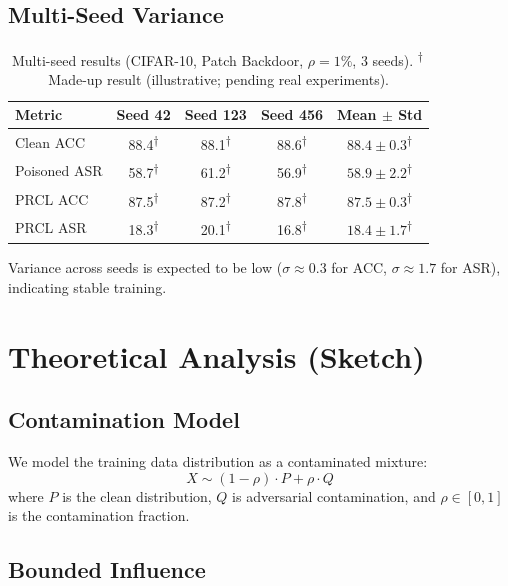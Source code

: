 \documentclass[11pt,a4paper]{article}
\newcommand{\madeupresult}[1]{\textcolor{madeup}{#1\textsuperscript{$\dagger$}}}
\newcommand{\daggernote}{\textsuperscript{$\dagger$}\,\textcolor{madeup}{Made-up result (illustrative; pending real experiments).}}
\begin{document}
\subsection{Multi-Seed Variance}

\begin{table}[h]
\centering
\caption{Multi-seed results (CIFAR-10, Patch Backdoor, $\rho\!=\!1\%$, 3 seeds). \daggernote}
\label{tab:multiseed}
\begin{tabular}{@{}lcccc@{}}
\toprule
\textbf{Metric} & \textbf{Seed 42} & \textbf{Seed 123} & \textbf{Seed 456}
& \textbf{Mean $\pm$ Std} \\
\midrule
Clean ACC
  & \madeupresult{88.4} & \madeupresult{88.1} & \madeupresult{88.6}
  & \madeupresult{$88.4\pm0.3$} \\
Poisoned ASR
  & \madeupresult{58.7} & \madeupresult{61.2} & \madeupresult{56.9}
  & \madeupresult{$58.9\pm2.2$} \\
PRCL ACC
  & \madeupresult{87.5} & \madeupresult{87.2} & \madeupresult{87.8}
  & \madeupresult{$87.5\pm0.3$} \\
PRCL ASR
  & \madeupresult{18.3} & \madeupresult{20.1} & \madeupresult{16.8}
  & \madeupresult{$18.4\pm1.7$} \\
\bottomrule
\end{tabular}
\end{table}

Variance across seeds is expected to be low ($\sigma\approx 0.3$ for ACC,
$\sigma\approx 1.7$ for ASR), indicating stable training.


\section{Theoretical Analysis (Sketch)}
\label{sec:theory}

\subsection{Contamination Model}

We model the training data distribution as a contaminated mixture:
\begin{equation}
  X \sim (1-\rho)\cdot P + \rho\cdot Q
\end{equation}
where $P$ is the clean distribution, $Q$ is adversarial contamination,
and $\rho\in[0,1]$ is the contamination fraction.

\subsection{Bounded Influence}
\end{document}
